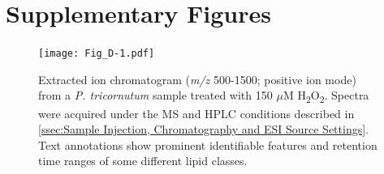 \clearpage

\section{Supplementary Figures}

\begin{figure}[!th]
\centering
\texttt{[image: Fig\_D-1.pdf]}
\caption[Extracted ion chromatogram from a \emph{P. tricornutum} sample treated with 150 $\mu$M H\textsubscript{2}O\textsubscript{2}]{Extracted ion chromatogram (\emph{m/z} 500-1500; positive ion mode) from a \emph{P. tricornutum} sample treated with 150 $\mu$M H\textsubscript{2}O\textsubscript{2}. Spectra were acquired under the MS and HPLC conditions described in \autoref{ssec:Sample Injection, Chromatography and ESI Source Settings}. Text annotations show prominent identifiable features and retention time ranges of some different lipid classes.}
\label{fig:adn1}
\end{figure}

\clearpage

